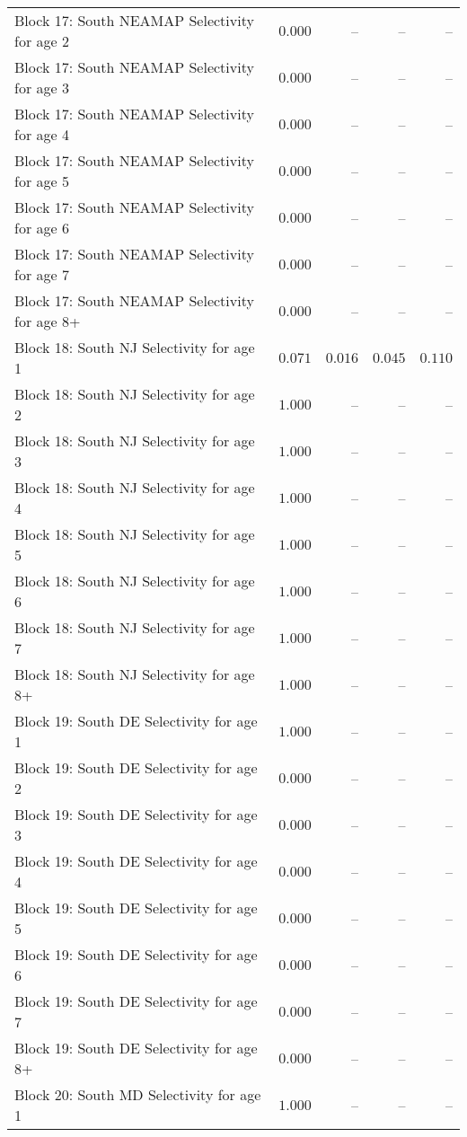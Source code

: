 \documentclass[
]{article}
\begin{document}
\begin{landscape}
\begin{longtable}[t]{lrrrr}
Block 17: South NEAMAP Selectivity for age 2 & $0.000$ & -- & -- & --\\
Block 17: South NEAMAP Selectivity for age 3 & $0.000$ & -- & -- & --\\
Block 17: South NEAMAP Selectivity for age 4 & $0.000$ & -- & -- & --\\
Block 17: South NEAMAP Selectivity for age 5 & $0.000$ & -- & -- & --\\
\addlinespace
Block 17: South NEAMAP Selectivity for age 6 & $0.000$ & -- & -- & --\\
Block 17: South NEAMAP Selectivity for age 7 & $0.000$ & -- & -- & --\\
Block 17: South NEAMAP Selectivity for age 8+ & $0.000$ & -- & -- & --\\
Block 18: South NJ Selectivity for age 1 & $0.071$ & $0.016$ & $0.045$ & $0.110$\\
Block 18: South NJ Selectivity for age 2 & $1.000$ & -- & -- & --\\
\addlinespace
Block 18: South NJ Selectivity for age 3 & $1.000$ & -- & -- & --\\
Block 18: South NJ Selectivity for age 4 & $1.000$ & -- & -- & --\\
Block 18: South NJ Selectivity for age 5 & $1.000$ & -- & -- & --\\
Block 18: South NJ Selectivity for age 6 & $1.000$ & -- & -- & --\\
Block 18: South NJ Selectivity for age 7 & $1.000$ & -- & -- & --\\
\addlinespace
Block 18: South NJ Selectivity for age 8+ & $1.000$ & -- & -- & --\\
Block 19: South DE Selectivity for age 1 & $1.000$ & -- & -- & --\\
Block 19: South DE Selectivity for age 2 & $0.000$ & -- & -- & --\\
Block 19: South DE Selectivity for age 3 & $0.000$ & -- & -- & --\\
Block 19: South DE Selectivity for age 4 & $0.000$ & -- & -- & --\\
\addlinespace
Block 19: South DE Selectivity for age 5 & $0.000$ & -- & -- & --\\
Block 19: South DE Selectivity for age 6 & $0.000$ & -- & -- & --\\
Block 19: South DE Selectivity for age 7 & $0.000$ & -- & -- & --\\
Block 19: South DE Selectivity for age 8+ & $0.000$ & -- & -- & --\\
Block 20: South MD Selectivity for age 1 & $1.000$ & -- & -- & --\\

\end{longtable}
\end{landscape}
\end{document}
